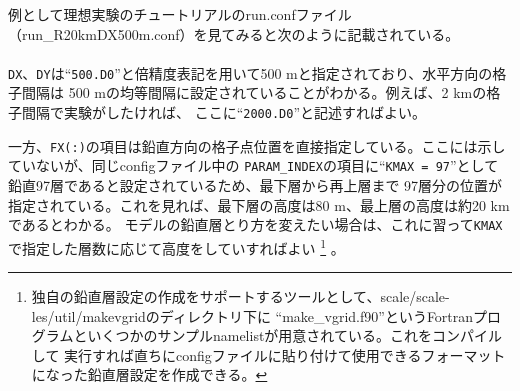 例として理想実験のチュートリアルのrun.confファイル（run\_R20kmDX500m.conf）を見てみると次のように記載されている。\\

{\small {\gt
{}}}\\

\verb|DX|、\verb|DY|は``\verb|500.D0|''と倍精度表記を用いて500 mと指定されており、水平方向の格子間隔は
500 mの均等間隔に設定されていることがわかる。例えば、2 kmの格子間隔で実験がしたければ、
ここに``\verb|2000.D0|''と記述すればよい。

一方、\verb|FX(:)|の項目は鉛直方向の格子点位置を直接指定している。ここには示していないが、同じconfigファイル中の
\verb|PARAM_INDEX|の項目に``\verb|KMAX = 97|''として鉛直97層であると設定されているため、最下層から再上層まで
97層分の位置が指定されている。これを見れば、最下層の高度は80 m、最上層の高度は約20 kmであるとわかる。
モデルの鉛直層とり方を変えたい場合は、これに習って\verb|KMAX|で指定した層数に応じて高度をしていすればよい
\footnote{独自の鉛直層設定の作成をサポートするツールとして、scale/scale-les/util/makevgridのディレクトリ下に
``make\_vgrid.f90''というFortranプログラムといくつかのサンプルnamelistが用意されている。これをコンパイルして
実行すれば直ちにconfigファイルに貼り付けて使用できるフォーマットになった鉛直層設定を作成できる。}
。


